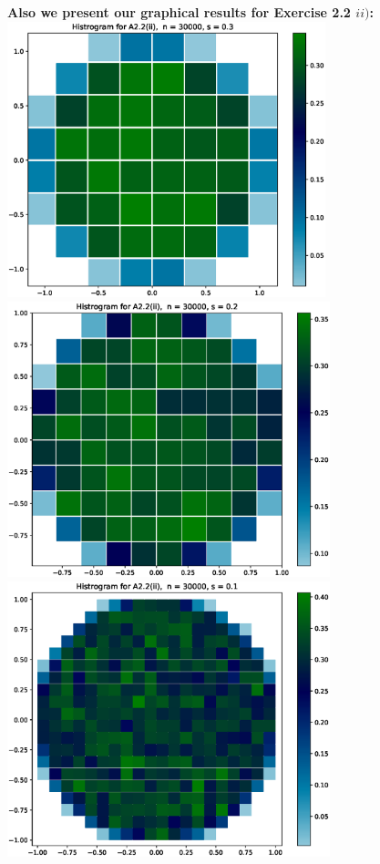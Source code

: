 \documentclass{article}
\begin{document}
\newpage
\textbf{Also we present our graphical results for Exercise 2.2 $ii)$:} \\
\hspace*{-1.5cm}\includegraphics[height=8cm]{Figures_for_A2.2_ii//1.eps} \hspace*{-1.5cm}
\includegraphics[height=8cm]{Figures_for_A2.2_ii//2.eps}\\
\hspace*{-1.5cm}\includegraphics[height=8cm]{Figures_for_A2.2_ii//3.eps} \hspace*{-1.5cm}
\end{document}

